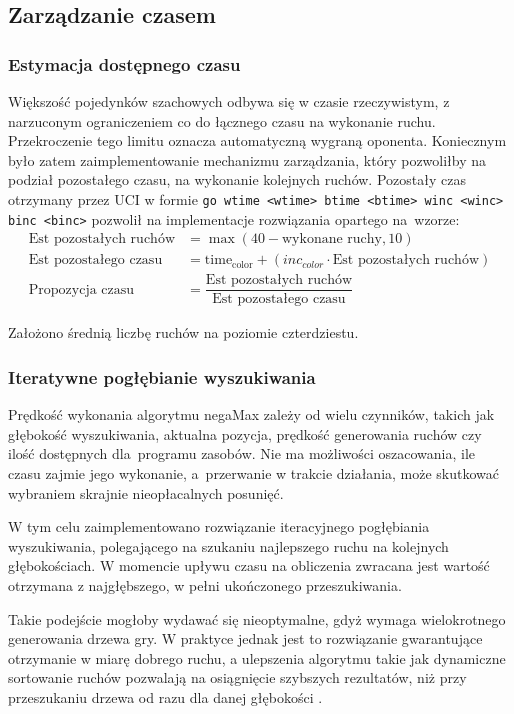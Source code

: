\subsection{Zarządzanie czasem}
\label{subsec:zarzadzanie-czasem}
\subsubsection{Estymacja dostępnego czasu}
Większość pojedynków szachowych odbywa się w czasie rzeczywistym, z narzuconym ograniczeniem co do łącznego czasu na wykonanie ruchu.
Przekroczenie tego limitu oznacza automatyczną wygraną oponenta.
Koniecznym było zatem zaimplementowanie mechanizmu zarządzania, który pozwoliłby na podział pozostałego czasu, na wykonanie kolejnych ruchów.
Pozostały czas otrzymany przez UCI w formie \texttt{go wtime <wtime> btime <btime> winc <winc> binc <binc>} pozwolił na implementacje rozwiązania opartego na~wzorze:
\begin{align*}
    \text{Est pozostałych ruchów} &= {\max(40 - \text{wykonane ruchy}, 10)} \\
    \text{Est pozostałego czasu} &= \mathrm{time_{color}} + (inc_{color} \cdot \text{Est pozostałych ruchów}) \\
    \text{Propozycja czasu} &= \dfrac{\text{Est pozostałych ruchów}}{\text{Est pozostałego czasu}}
\end{align*}

Założono średnią liczbę ruchów na poziomie czterdziestu.

\subsubsection{Iteratywne pogłębianie wyszukiwania}
Prędkość wykonania algorytmu negaMax zależy od wielu czynników, takich jak głębokość wyszukiwania, aktualna pozycja, prędkość generowania ruchów czy ilość dostępnych dla~programu zasobów.
Nie ma możliwości oszacowania, ile czasu zajmie jego wykonanie, a~przerwanie w trakcie działania, może skutkować wybraniem skrajnie nieopłacalnych posunięć.

W tym celu zaimplementowano rozwiązanie iteracyjnego pogłębiania wyszukiwania, polegającego na szukaniu najlepszego ruchu na kolejnych głębokościach.
W momencie upływu czasu na obliczenia zwracana jest wartość otrzymana z najgłębszego, w pełni ukończonego przeszukiwania.

Takie podejście mogłoby wydawać się nieoptymalne, gdyż wymaga wielokrotnego generowania drzewa gry.
W praktyce jednak jest to rozwiązanie gwarantujące otrzymanie w miarę dobrego ruchu, a ulepszenia algorytmu takie jak dynamiczne sortowanie ruchów pozwalają na osiągnięcie szybszych rezultatów, niż przy przeszukaniu drzewa od razu dla danej głębokości \cite*{wiki-deepening}.